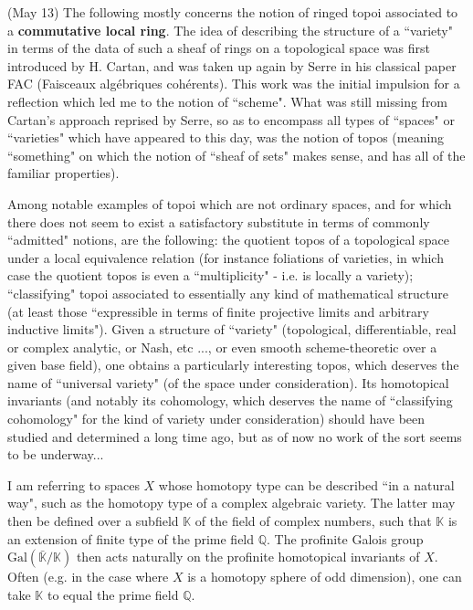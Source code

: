 \label{note:46.5}

(May 13) The following mostly concerns the notion of ringed topoi associated to a \textbf{commutative local ring}. The idea of describing the structure of a ``variety" in terms of the data of such a sheaf of rings on a topological space was first introduced by H. Cartan, and was taken up again by Serre in his classical paper FAC (Faisceaux alg\'ebriques coh\'erents). This work was the initial impulsion for a reflection which led me to the notion of ``scheme". What was still missing from Cartan's approach reprised by Serre, so as to encompass all types of ``spaces" or ``varieties" which have appeared to this day, was the notion of topos (meaning ``something" on which the notion of ``sheaf of sets" makes sense, and has all of the familiar properties).  

\label{note:46.6}

Among notable examples of topoi which are not ordinary spaces, and for which there does not seem to exist a satisfactory substitute in terms of commonly ``admitted" notions, are the following: the quotient topos of a topological space under a local equivalence relation (for instance foliations of varieties, in which case the quotient topos is even a ``multiplicity" - i.e. is locally a variety); ``classifying" topoi associated to essentially any kind of mathematical structure (at least those ``expressible in terms of finite projective limits and arbitrary inductive limits"). Given a structure of ``variety" (topological, differentiable, real or complex analytic, or Nash, etc ..., or even smooth scheme-theoretic over a given base field), one obtains a particularly interesting topos, which deserves the name of ``universal variety" (of the space under consideration). Its homotopical invariants (and notably its cohomology, which deserves the name of ``classifying cohomology" for the kind of variety under consideration) should have been studied and determined a long time ago, but as of now no work of the sort seems to be underway...

\label{note:46.7}

I am referring to spaces $X$ whose homotopy type can be described ``in a natural way", such as the homotopy type of a complex algebraic variety. The latter may then be defined over a subfield $\mathbb{K}$ of the field of complex numbers, such that $\mathbb{K}$ is an extension of finite type of the prime field $\mathbb{Q}$. The profinite Galois group $\text{Gal}(\bar{\mathbb{K}}/\mathbb{K})$ then acts naturally on the profinite homotopical invariants of $X$. Often (e.g. in the case where $X$ is a homotopy sphere of odd dimension), one can take $\mathbb{K}$ to equal the prime field $\mathbb{Q}$.

